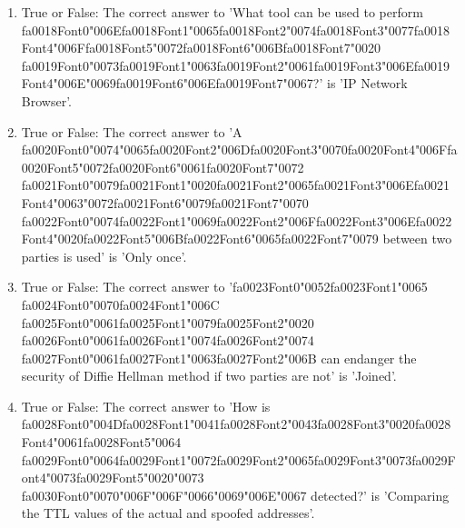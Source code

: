 \documentclass[12pt]{article}
\begin{document}
\begin{enumerate}[label=\arabic*.]
\item True or False: The correct answer to 'What tool can be used to perform {\csname fa0018Font0\endcsname\char"006E}{\csname fa0018Font1\endcsname\char"0065}{\csname fa0018Font2\endcsname\char"0074}{\csname fa0018Font3\endcsname\char"0077}{\csname fa0018Font4\endcsname\char"006F}{\csname fa0018Font5\endcsname\char"0072}{\csname fa0018Font6\endcsname\char"006B}{\csname fa0018Font7\endcsname\char"0020} {\csname fa0019Font0\endcsname\char"0073}{\csname fa0019Font1\endcsname\char"0063}{\csname fa0019Font2\endcsname\char"0061}{\csname fa0019Font3\endcsname\char"006E}{\csname fa0019Font4\endcsname\char"006E}{\char"0069}{\csname fa0019Font6\endcsname\char"006E}{\csname fa0019Font7\endcsname\char"0067}?' is 'IP Network Browser'.
\item True or False: The correct answer to 'A {\csname fa0020Font0\endcsname\char"0074}{\char"0065}{\csname fa0020Font2\endcsname\char"006D}{\csname fa0020Font3\endcsname\char"0070}{\csname fa0020Font4\endcsname\char"006F}{\csname fa0020Font5\endcsname\char"0072}{\csname fa0020Font6\endcsname\char"0061}{\csname fa0020Font7\endcsname\char"0072} {\csname fa0021Font0\endcsname\char"0079}{\csname fa0021Font1\endcsname\char"0020}{\csname fa0021Font2\endcsname\char"0065}{\csname fa0021Font3\endcsname\char"006E}{\csname fa0021Font4\endcsname\char"0063}{\char"0072}{\csname fa0021Font6\endcsname\char"0079}{\csname fa0021Font7\endcsname\char"0070} {\csname fa0022Font0\endcsname\char"0074}{\csname fa0022Font1\endcsname\char"0069}{\csname fa0022Font2\endcsname\char"006F}{\csname fa0022Font3\endcsname\char"006E}{\csname fa0022Font4\endcsname\char"0020}{\csname fa0022Font5\endcsname\char"006B}{\csname fa0022Font6\endcsname\char"0065}{\csname fa0022Font7\endcsname\char"0079} between two parties is used' is 'Only once'.
\item True or False: The correct answer to '{\csname fa0023Font0\endcsname\char"0052}{\csname fa0023Font1\endcsname\char"0065} {\csname fa0024Font0\endcsname\char"0070}{\csname fa0024Font1\endcsname\char"006C} {\csname fa0025Font0\endcsname\char"0061}{\csname fa0025Font1\endcsname\char"0079}{\csname fa0025Font2\endcsname\char"0020} {\csname fa0026Font0\endcsname\char"0061}{\csname fa0026Font1\endcsname\char"0074}{\csname fa0026Font2\endcsname\char"0074} {\csname fa0027Font0\endcsname\char"0061}{\csname fa0027Font1\endcsname\char"0063}{\csname fa0027Font2\endcsname\char"006B} can endanger the security of Diffie Hellman method if two parties are not' is 'Joined'.
\item True or False: The correct answer to 'How is {\csname fa0028Font0\endcsname\char"004D}{\csname fa0028Font1\endcsname\char"0041}{\csname fa0028Font2\endcsname\char"0043}{\csname fa0028Font3\endcsname\char"0020}{\csname fa0028Font4\endcsname\char"0061}{\csname fa0028Font5\endcsname\char"0064} {\csname fa0029Font0\endcsname\char"0064}{\csname fa0029Font1\endcsname\char"0072}{\csname fa0029Font2\endcsname\char"0065}{\csname fa0029Font3\endcsname\char"0073}{\csname fa0029Font4\endcsname\char"0073}{\csname fa0029Font5\endcsname\char"0020}{\char"0073} {\csname fa0030Font0\endcsname\char"0070}{\char"006F}{\char"006F}{\char"0066}{\char"0069}{\char"006E}{\char"0067} detected?' is 'Comparing the TTL values of the actual and spoofed addresses'.

\end{enumerate}
\end{document}
